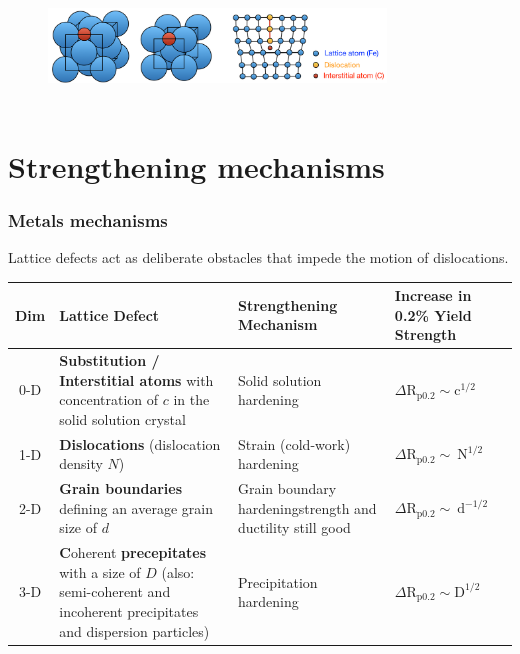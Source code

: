 \documentclass{article}
\begin{document}
\begin{figure}[ht!]
  \centering
  \includegraphics[width=0.8\textwidth]{media/cottrell_atmospheres.png}
  \caption*\\\vspace*{-0.25cm}{Carbon atoms occupy small octahedral sites (left), preferentially diffuse to dislocation regions (center), which forms Cottrell atmospheres that pin dislocations (right)}
\end{figure}

\section{Strengthening mechanisms}
\subsubsection{Metals mechanisms}
Lattice defects act as deliberate obstacles that impede the motion of dislocations.

\begin{tabularx}{\textwidth}{|c|p{6.5cm}|X|p{3cm}|}
\hline \textbf{Dim} & \textbf{Lattice Defect} & \textbf{Strengthening Mechanism} & \textbf{Increase in 0.2\% Yield Strength} \\
\hline 0-D & \textbf{Substitution / Interstitial atoms} with concentration of $c$ in the solid solution crystal & Solid solution hardening & $\Delta \mathrm{R}_{\mathrm{p} 0.2} \sim \mathrm{c}^{1 / 2}$ \\
\hline 1-D & \textbf{Dislocations} (dislocation density $N$) & Strain (cold-work) hardening & $\Delta \mathrm{R}_{\mathrm{p} 0.2} \sim \mathrm{~N}^{1 / 2}$ \\
\hline 2-D & \textbf{Grain boundaries} defining an average grain size of $d$ & Grain boundary hardening\hfill {\color{red}strength and ductility still good} & $\Delta \mathrm{R}_{\mathrm{p} 0.2} \sim \mathrm{~d}^{-1 / 2}$ \\
\hline 3-D & \textbf Coherent \textbf{precepitates} with a size of $D$ (also: semi-coherent and incoherent precipitates and dispersion particles) & Precipitation hardening & $\Delta \mathrm{R}_{\mathrm{p} 0.2} \sim \mathrm{D}^{1 / 2}$ \\
\hline
\end{tabularx}
\end{document}
